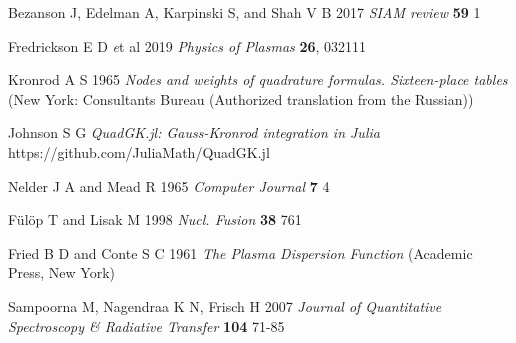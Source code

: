 \documentclass[12pt]{iopart}
\begin{document}
\begin{thebibliography}{9}
Bezanson J, Edelman A, Karpinski S, and Shah V B 2017 \textit{SIAM review} \textbf{59} 1

Fredrickson E D {\textit et al} 2019 \textit{Physics of Plasmas} \textbf{26}, 032111

Kronrod A S 1965 \textit{Nodes and weights of quadrature formulas. Sixteen-place tables} (New York: Consultants Bureau (Authorized translation from the Russian))

Johnson S G \textit{QuadGK.jl: Gauss-Kronrod integration in Julia} https://github.com/JuliaMath/QuadGK.jl

Nelder J A and Mead R 1965 \textit{Computer Journal} \textbf{7} 4

F{\"u}l{\"o}p T and Lisak M 1998 \textit{Nucl. Fusion} \textbf{38} 761

Fried B D and Conte S C 1961 \textit{The Plasma Dispersion Function} (Academic Press, New York)

Sampoorna M, Nagendraa K N, Frisch H 2007 \textit{Journal of Quantitative Spectroscopy \& Radiative Transfer} \textbf{104} 71-85


\end{thebibliography}
\end{document}

